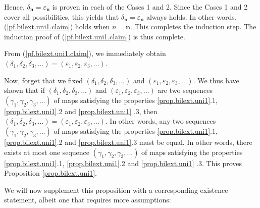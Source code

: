 \documentclass[etingof-lie.tex]{subfiles}
\begin{document}
\begin{noncompile}
\begin{verlong}
Hence, $\delta_{\mathbf{n}}=\varepsilon_{\mathbf{n}}$ is proven in each of the
Cases 1 and 2. Since the Cases 1 and 2 cover all possibilities, this yields
that $\delta_{\mathbf{n}}=\varepsilon_{\mathbf{n}}$ always holds. In other
words, (\ref{pf.bilext.uni1.claim}) holds when $n=\mathbf{n}$. This completes
the induction step. The induction proof of (\ref{pf.bilext.uni1.claim}) is
thus complete.

From (\ref{pf.bilext.uni1.claim}), we immediately obtain $\left(  \delta
_{1},\delta_{2},\delta_{3},...\right)  =\left(  \varepsilon_{1},\varepsilon
_{2},\varepsilon_{3},...\right)  $.

Now, forget that we fixed $\left(  \delta_{1},\delta_{2},\delta_{3}%
,...\right)  $ and $\left(  \varepsilon_{1},\varepsilon_{2},\varepsilon
_{3},...\right)  $. We thus have shown that if $\left(  \delta_{1},\delta
_{2},\delta_{3},...\right)  $ and $\left(  \varepsilon_{1},\varepsilon
_{2},\varepsilon_{3},...\right)  $ are two sequences $\left(  \gamma
_{1},\gamma_{2},\gamma_{3},...\right)  $ of maps satisfying the properties
\ref{prop.bilext.uni1}.1, \ref{prop.bilext.uni1}.2 and \ref{prop.bilext.uni1}%
.3, then $\left(  \delta_{1},\delta_{2},\delta_{3},...\right)  =\left(
\varepsilon_{1},\varepsilon_{2},\varepsilon_{3},...\right)  $. In other words,
any two sequences $\left(  \gamma_{1},\gamma_{2},\gamma_{3},...\right)  $ of
maps satisfying the properties \ref{prop.bilext.uni1}.1,
\ref{prop.bilext.uni1}.2 and \ref{prop.bilext.uni1}.3 must be equal. In other
words, there exists at most one sequence $\left(  \gamma_{1},\gamma_{2}%
,\gamma_{3},...\right)  $ of maps satisfying the properties
\ref{prop.bilext.uni1}.1, \ref{prop.bilext.uni1}.2 and \ref{prop.bilext.uni1}%
.3. This proves Proposition \ref{prop.bilext.uni1}.
\end{verlong}

We will now supplement this proposition with a corresponding existence
statement, albeit one that requires more assumptions:


\end{noncompile}
\end{document}
